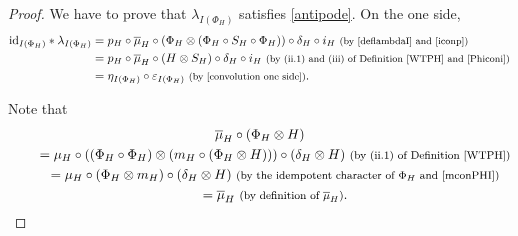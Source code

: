 \documentclass[pdftex]{sigma}
\numberwithin{equation}{section}
\begin{document}
\begin{proof}
We have to prove that $\lambda_{I(\Phi_{H})}$ satisfies \eqref{antipode}. On the one side,
\begin{align*}
{\rm id}_{I(\Phi_{H})}\ast \lambda_{I(\Phi_{H})}
={}&p_{H}\circ\overline{\mu}_{H}\circ(\Phi_{H}\otimes(\Phi_{H}\circ S_{H}\circ \Phi_{H}))\circ\delta_{H}\circ i_{H}\ \text{\footnotesize\textnormal{(by \eqref{deflambdaI} and \eqref{iconp})}}\\
={}&p_{H}\circ \overline{\mu}_{H}\circ(H\otimes S_{H})\circ\delta_{H}\circ i_{H}\ \text{\footnotesize\textnormal{(by (ii.1) and (iii) of Definition \ref{WTPH} and \eqref{Phiconi})}}\\
={}&\eta_{I(\Phi_{H})}\circ\varepsilon_{I(\Phi_{H})}\ \text{\footnotesize\textnormal{(by \eqref{convolution one side})}}.
\end{align*}

Note that
\begin{gather}
\overline{\mu}_{H}\circ(\Phi_{H}\otimes H)\nonumber\\
\qquad{} =\mu_{H}\circ((\Phi_{H}\circ \Phi_{H})\otimes(m_{H}\circ(\Phi_{H}\otimes H)))\circ(\delta_{H}\otimes H)\ \text{\footnotesize\textnormal{(by (ii.1) of Definition \ref{WTPH})}}\nonumber\\
\qquad{} =\mu_{H}\circ(\Phi_{H}\otimes m_{H})\circ(\delta_{H}\otimes H)\ \text{\footnotesize\textnormal{(by the idempotent character of $\Phi_{H}$ and \eqref{mconPHI})}}\nonumber\\
\qquad{} =\overline{\mu}_{H}\ \text{\footnotesize\textnormal{(by definition of $\overline{\mu}_{H}$)}}.\label{barmuPhi}
\end{gather}


\end{proof}
\end{document}

